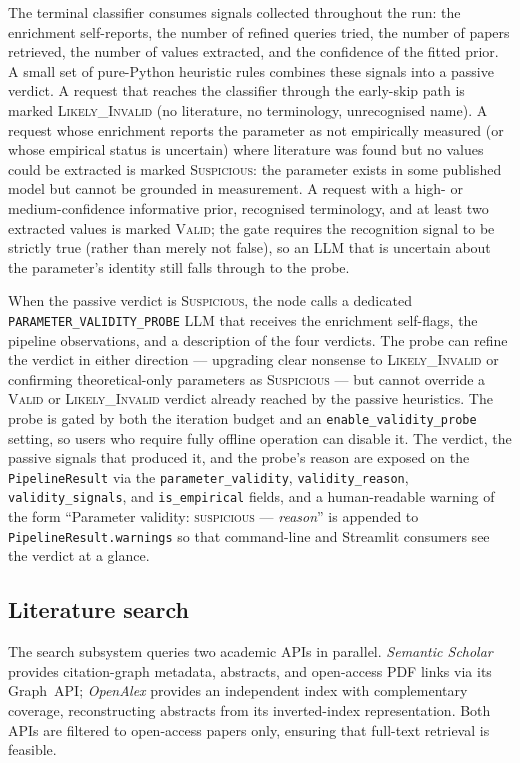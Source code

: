 \documentclass[11pt,a4paper]{article}
\begin{document}
The terminal classifier consumes signals collected throughout the run: the enrichment self-reports, the number of refined queries tried, the number of papers retrieved, the number of values extracted, and the confidence of the fitted prior. A small set of pure-Python heuristic rules combines these signals into a passive verdict. A request that reaches the classifier through the early-skip path is marked \textsc{Likely\_Invalid} (no literature, no terminology, unrecognised name). A request whose enrichment reports the parameter as not empirically measured (or whose empirical status is uncertain) where literature was found but no values could be extracted is marked \textsc{Suspicious}: the parameter exists in some published model but cannot be grounded in measurement. A request with a high- or medium-confidence informative prior, recognised terminology, and at least two extracted values is marked \textsc{Valid}; the gate requires the recognition signal to be strictly true (rather than merely not false), so an LLM that is uncertain about the parameter's identity still falls through to the probe.

When the passive verdict is \textsc{Suspicious}, the node calls a dedicated \texttt{PARAMETER\_VALIDITY\_PROBE} LLM that receives the enrichment self-flags, the pipeline observations, and a description of the four verdicts. The probe can refine the verdict in either direction --- upgrading clear nonsense to \textsc{Likely\_Invalid} or confirming theoretical-only parameters as \textsc{Suspicious} --- but cannot override a \textsc{Valid} or \textsc{Likely\_Invalid} verdict already reached by the passive heuristics. The probe is gated by both the iteration budget and an \texttt{enable\_validity\_probe} setting, so users who require fully offline operation can disable it. The verdict, the passive signals that produced it, and the probe's reason are exposed on the \texttt{PipelineResult} via the \texttt{parameter\_validity}, \texttt{validity\_reason}, \texttt{validity\_signals}, and \texttt{is\_empirical} fields, and a human-readable warning of the form ``Parameter validity: \textsc{suspicious} --- \textit{reason}'' is appended to \texttt{PipelineResult.warnings} so that command-line and Streamlit consumers see the verdict at a glance.

\subsection{Literature search}

The search subsystem queries two academic APIs in parallel. \textit{Semantic Scholar} provides citation-graph metadata, abstracts, and open-access PDF links via its Graph~API; \textit{OpenAlex} provides an independent index with complementary coverage, reconstructing abstracts from its inverted-index representation. Both APIs are filtered to open-access papers only, ensuring that full-text retrieval is feasible.
\end{document}
